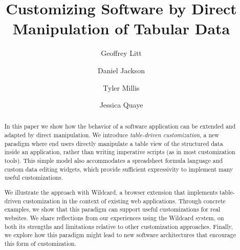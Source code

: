\documentclass[sigplan,screen,10pt,anonymous,review]{acmart}
\begin{document}
\title{Customizing Software by Direct Manipulation of Tabular Data}


\author{Geoffrey Litt}

\author{Daniel Jackson}

\author{Tyler Millis}

\author{Jessica Quaye}


\begin{abstract}
  In this paper we show how the behavior of a software application can
  be extended and adapted by direct manipulation. We introduce
  \emph{table-driven customization}, a new paradigm where end users
  directly manipulate a table view of the structured data inside an
  application, rather than writing imperative scripts (as in most
  customization tools). This simple model also accommodates a
  spreadsheet formula language and custom data editing widgets, which
  provide sufficient expressivity to implement many useful
  customizations.

  We illustrate the approach with Wildcard, a browser extension that
  implements table-driven customization in the context of existing web
  applications. Through concrete examples, we show that this paradigm
  can support useful customizations for real websites. We share
  reflections from our experiences using the Wildcard system, on both
  its strengths and limitations relative to other customization
  approaches. Finally, we explore how this paradigm might lead to new
  software architectures that encourage this form of customization.
\end{abstract}
\end{document}
